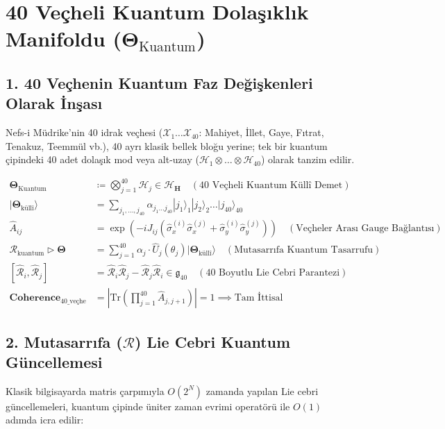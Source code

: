 \documentclass[11pt, a4paper]{article}
\begin{document}
\section{40 Veçheli Kuantum Dolaşıklık Manifoldu ($\mathbf{\Theta}_{\text{Kuantum}}$)}

\subsection{1. 40 Veçhenin Kuantum Faz Değişkenleri Olarak İnşası}
Nefs-i Müdrike'nin 40 idrak veçhesi ($\mathcal{X}_1 \dots \mathcal{X}_{40}$: Mahiyet, İllet, Gaye, Fıtrat, Tenakuz, Teemmül vb.), 40 ayrı klasik bellek bloğu yerine; tek bir kuantum çipindeki 40 adet dolaşık mod veya alt-uzay ($\mathcal{H}_1 \otimes \dots \otimes \mathcal{H}_{40}$) olarak tanzim edilir.

\begin{align}
\mathbf{\Theta}_{\text{Kuantum}} &\coloneqq \bigotimes_{j=1}^{40} \mathcal{H}_j \in \mathcal{H}_{\mathbf{H}} \quad (\text{40 Veçheli Kuantum Küllî Demet}) \\
|\mathbf{\Theta}_{\text{küllî}}\rangle &= \sum_{j_1, \dots, j_{40}} \alpha_{j_1 \dots j_{40}} |j_1\rangle_1 |j_2\rangle_2 \dots |j_{40}\rangle_{40} \\
\hat{A}_{ij} &= \exp\left( -i J_{ij} (\hat{\sigma}_x^{(i)} \hat{\sigma}_x^{(j)} + \hat{\sigma}_y^{(i)} \hat{\sigma}_y^{(j)}) \right) \quad (\text{Veçheler Arası Gauge Bağlantısı}) \\
\mathcal{R}_{\text{kuantum}} \triangleright \mathbf{\Theta} &= \sum_{j=1}^{40} \alpha_j \cdot \hat{U}_j(\theta_j) |\mathbf{\Theta}_{\text{küllî}}\rangle \quad (\text{Mutasarrıfa Kuantum Tasarrufu}) \\
[\hat{\mathcal{R}}_i, \hat{\mathcal{R}}_j] &= \hat{\mathcal{R}}_i \hat{\mathcal{R}}_j - \hat{\mathcal{R}}_j \hat{\mathcal{R}}_i \in \mathfrak{g}_{40} \quad (\text{40 Boyutlu Lie Cebri Parantezi}) \\
\mathbf{Coherence}_{\text{40\_veçhe}} &= \left| \text{Tr}\left( \prod_{j=1}^{40} \hat{A}_{j, j+1} \right) \right| = 1 \implies \text{Tam İttisal}
\end{align}

\subsection{2. Mutasarrıfa ($\mathcal{R}$) Lie Cebri Kuantum Güncellemesi}
Klasik bilgisayarda matris çarpımıyla $O(2^N)$ zamanda yapılan Lie cebri güncellemeleri, kuantum çipinde üniter zaman evrimi operatörü ile $O(1)$ adımda icra edilir:
\end{document}
